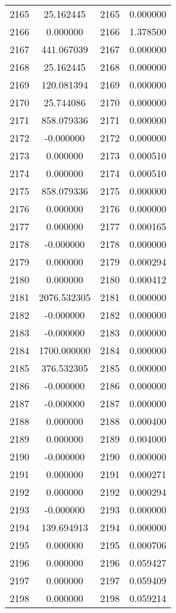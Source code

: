 \documentclass[12pt]{article}
\begin{document}
\begin{longtable}{@{}cccc@{}}
2165 & 25.162445 & 2165 & 0.000000 \\
2166 & 0.000000 & 2166 & 1.378500 \\
2167 & 441.067039 & 2167 & 0.000000 \\
2168 & 25.162445 & 2168 & 0.000000 \\
2169 & 120.081394 & 2169 & 0.000000 \\
2170 & 25.744086 & 2170 & 0.000000 \\
2171 & 858.079336 & 2171 & 0.000000 \\
2172 & -0.000000 & 2172 & 0.000000 \\
2173 & 0.000000 & 2173 & 0.000510 \\
2174 & 0.000000 & 2174 & 0.000510 \\
2175 & 858.079336 & 2175 & 0.000000 \\
2176 & 0.000000 & 2176 & 0.000000 \\
2177 & 0.000000 & 2177 & 0.000165 \\
2178 & -0.000000 & 2178 & 0.000000 \\
2179 & 0.000000 & 2179 & 0.000294 \\
2180 & 0.000000 & 2180 & 0.000412 \\
2181 & 2076.532305 & 2181 & 0.000000 \\
2182 & -0.000000 & 2182 & 0.000000 \\
2183 & -0.000000 & 2183 & 0.000000 \\
2184 & 1700.000000 & 2184 & 0.000000 \\
2185 & 376.532305 & 2185 & 0.000000 \\
2186 & -0.000000 & 2186 & 0.000000 \\
2187 & -0.000000 & 2187 & 0.000000 \\
2188 & 0.000000 & 2188 & 0.000400 \\
2189 & 0.000000 & 2189 & 0.004000 \\
2190 & -0.000000 & 2190 & 0.000000 \\
2191 & 0.000000 & 2191 & 0.000271 \\
2192 & 0.000000 & 2192 & 0.000294 \\
2193 & -0.000000 & 2193 & 0.000000 \\
2194 & 139.694913 & 2194 & 0.000000 \\
2195 & 0.000000 & 2195 & 0.000706 \\
2196 & 0.000000 & 2196 & 0.059427 \\
2197 & 0.000000 & 2197 & 0.059409 \\
2198 & 0.000000 & 2198 & 0.059214 \\

\end{longtable}
\end{document}
